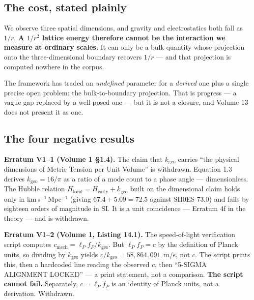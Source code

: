 \documentclass[11pt, letterpaper, openany]{book}
\newcommand{\kgeo}{k_{\mathrm{geo}}}
\begin{document}
\subsection{The cost, stated plainly}

\begin{warningbox}
We observe three spatial dimensions, and gravity and electrostatics both fall as $1/r$. \textbf{A
$1/r^2$ lattice energy therefore cannot be the interaction we measure at ordinary scales.} It can
only be a bulk quantity whose projection onto the three-dimensional boundary recovers $1/r$ ---
and that projection is computed nowhere in the corpus.

\medskip
\noindent The framework has traded an \emph{undefined} parameter for a \emph{derived} one plus a
single precise open problem: the bulk-to-boundary projection. That is progress --- a vague gap
replaced by a well-posed one --- but it is not a closure, and Volume 13 does not present it as
one.
\end{warningbox}

\subsection{The four negative results}

\begin{erratumbox}
\textbf{Erratum V1--1 (Volume 1 \S1.4).} The claim that $\kgeo$ carries ``the physical dimensions
of Metric Tension per Unit Volume'' is withdrawn. Equation 1.3 derives $\kgeo = 16/\pi$ as a ratio
of a mode count to a phase angle --- dimensionless. The Hubble relation
$H_{\mathrm{local}} = H_{\mathrm{early}} + \kgeo$ built on the dimensional claim holds only in
km\,s$^{-1}$\,Mpc$^{-1}$ (giving $67.4 + 5.09 = 72.5$ against SH0ES $73.0$) and fails by eighteen
orders of magnitude in SI. It is a unit coincidence --- Erratum 4f in the theory --- and is
withdrawn.
\end{erratumbox}

\begin{erratumbox}
\textbf{Erratum V1--2 (Volume 1, Listing 14.1).} The speed-of-light verification script computes
$c_{\mathrm{mech}} = \ell_P f_P / \kgeo$. But $\ell_P f_P = c$ by the definition of Planck units,
so dividing by $\kgeo$ yields $c/\kgeo = 58{,}864{,}091$~m/s, not $c$. The script prints this,
then a hardcoded line reading the observed $c$, then ``5-SIGMA ALIGNMENT LOCKED'' --- a print
statement, not a comparison. \textbf{The script cannot fail.} Separately, $c = \ell_P f_P$ is an
identity of Planck units, not a derivation. Withdrawn.
\end{erratumbox}
\end{document}
